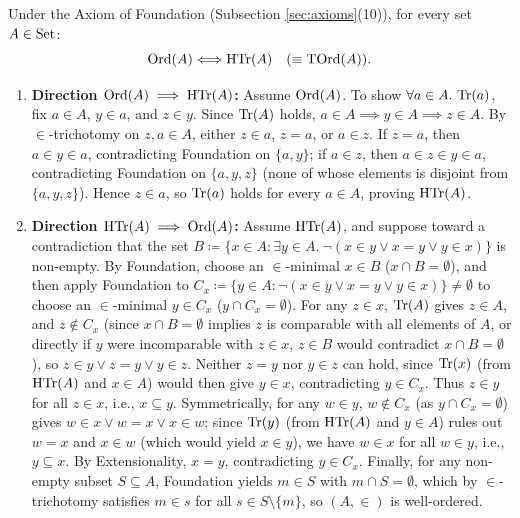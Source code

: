 \documentclass[10pt,a4paper]{article}
\begin{document}
\begin{theorem}\label{thm:ord_htr_equiv}
Under the Axiom of Foundation (Subsection \ref{sec:axioms}(10)), for every set $A \in {\textrm{Set}}$:
$${\textrm{Ord}}(A) \Longleftrightarrow {\textrm{HTr}}(A) \quad (\equiv {\textrm{TOrd}}(A)).$$
\end{theorem}
\myprf
\begin{enumerate}
\item \textbf{Direction ${\textrm{Ord}}(A) \implies {\textrm{HTr}}(A)$:} Assume ${\textrm{Ord}}(A)$. To show $\forall a \in A.\ {\textrm{Tr}}(a)$, fix $a \in A$, $y \in a$, and $z \in y$. Since ${\textrm{Tr}}(A)$ holds, $a \in A \implies y \in A \implies z \in A$. By $\in$-trichotomy on $z, a \in A$, either $z \in a$, $z = a$, or $a \in z$. If $z = a$, then $a \in y \in a$, contradicting Foundation on $\{a, y\}$; if $a \in z$, then $a \in z \in y \in a$, contradicting Foundation on $\{a, y, z\}$ (none of whose elements is disjoint from $\{a, y, z\}$). Hence $z \in a$, so ${\textrm{Tr}}(a)$ holds for every $a \in A$, proving ${\textrm{HTr}}(A)$.
\item \textbf{Direction ${\textrm{HTr}}(A) \implies {\textrm{Ord}}(A)$:} Assume ${\textrm{HTr}}(A)$, and suppose toward a contradiction that the set $B \coloneqq \{x \in A : \exists y \in A.\ \neg(x \in y \lor x = y \lor y \in x)\}$ is non-empty. By Foundation, choose an $\in$-minimal $x \in B$ ($x \cap B = \emptyset$), and then apply Foundation to $C_x \coloneqq \{y \in A : \neg(x \in y \lor x = y \lor y \in x)\} \neq \emptyset$ to choose an $\in$-minimal $y \in C_x$ ($y \cap C_x = \emptyset$). For any $z \in x$, ${\textrm{Tr}}(A)$ gives $z \in A$, and $z \notin C_x$ (since $x \cap B = \emptyset$ implies $z$ is comparable with all elements of $A$, or directly if $y$ were incomparable with $z \in x$, $z \in B$ would contradict $x \cap B = \emptyset$), so $z \in y \lor z = y \lor y \in z$. Neither $z = y$ nor $y \in z$ can hold, since ${\textrm{Tr}}(x)$ (from ${\textrm{HTr}}(A)$ and $x \in A$) would then give $y \in x$, contradicting $y \in C_x$. Thus $z \in y$ for all $z \in x$, i.e., $x \subseteq y$. Symmetrically, for any $w \in y$, $w \notin C_x$ (as $y \cap C_x = \emptyset$) gives $w \in x \lor w = x \lor x \in w$; since ${\textrm{Tr}}(y)$ (from ${\textrm{HTr}}(A)$ and $y \in A$) rules out $w = x$ and $x \in w$ (which would yield $x \in y$), we have $w \in x$ for all $w \in y$, i.e., $y \subseteq x$. By Extensionality, $x = y$, contradicting $y \in C_x$. Finally, for any non-empty subset $S \subseteq A$, Foundation yields $m \in S$ with $m \cap S = \emptyset$, which by $\in$-trichotomy satisfies $m \in s$ for all $s \in S \setminus \{m\}$, so $(A, \in)$ is well-ordered.
\end{enumerate}
\myqed
\end{document}
